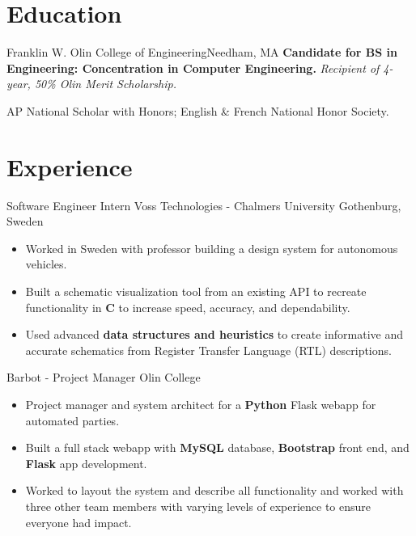 \documentclass[11 pt]{moderncv}
\begin{document}
\maketitle

\vspace{-.2in}

\section{Education}

{Franklin W. Olin College of Engineering}{}{Needham, MA}{}
{
	\textbf{Candidate for BS in Engineering: Concentration in Computer Engineering.}
	\newline
	\textit{Recipient of 4-year, 50\% Olin Merit Scholarship.}
}

{
	AP National Scholar with Honors; English \& French National Honor Society.
	\begin{flushright}
	\vspace {-0.3 in}
	\end{flushright}
	\vspace {-0.1 in}
}

\section{Experience}
\vspace{0.1 in}

{Software Engineer Intern}
{Voss Technologies - Chalmers University}
{Gothenburg, Sweden}
{}
{
\begin{itemize}
	\item Worked in Sweden with professor building a design system for autonomous vehicles.
	\item Built a schematic visualization tool from an existing API to recreate functionality in \textbf{C} to increase speed, accuracy, and dependability. 
	\item Used advanced \textbf{data structures and heuristics} to create informative and accurate schematics from Register Transfer Language (RTL) descriptions.
\end{itemize}
}


{Barbot -  Project Manager}
{Olin College}
{}
{}
{
\begin{itemize}
	\item Project manager and system architect for a \textbf{Python} Flask webapp for automated parties. 
	\item Built a full stack webapp with \textbf{MySQL} database, \textbf{Bootstrap} front end, and \textbf{Flask} app development. 
	\item Worked to layout the system and describe all functionality and worked with three other team members with varying levels of experience to ensure everyone had impact. 
\end{itemize}
}
\end{document}
